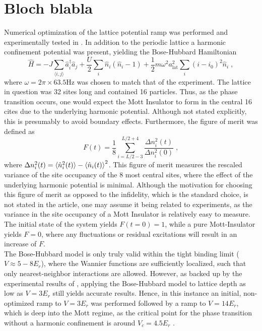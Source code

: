 \section{Bloch blabla}
Numerical optimization of the lattice potential ramp was performed and experimentally tested in \cite{FrankBloch}. In addition to the periodic lattice a harmonic confinement potential was present, yielding the Bose-Hubbard Hamiltonian
\begin{equation}
\hat{H} = - J \sum_{\langle i,j \rangle} \hat{a}_{i}^{\dag} \hat{a}_{j} + \frac{U}{2} \sum_{i} \hat{n}_i \left( \hat{n}_i -1 \right) + \frac{1}{2} m \omega^2 a_{\mathrm{lat}}^2 \sum_{i} \left( i - i_0 \right) ^2 \hat{n}_i \; ,  \label{eq:BHtrap}
\end{equation}
where $\omega = 2 \pi \times 63.5 \mathrm{Hz}$ was chosen to match that of the experiment. The lattice in question was 32 sites long and contained 16 particles. Thus, as the phase transition occurs, one would expect the Mott Insulator to form in the central 16 cites due to the underlying harmonic potential. Although not stated explicitly, this is presumably to avoid boundary effects. Furthermore, the figure of merit was defined as
\begin{equation}
	F(t) = \frac{1}{8} \sum_{i = L/2 -3}^{L/2 +4} \frac{\Delta n_{i}^2 (t)}{\Delta n_{i}^2 (0)} \; , \label{eq:FMerit}
\end{equation}
where $\Delta n_{i}^2 (t) = \braket{\hat{n}_{i}^2 (t)} - \braket{\hat{n}_{i} (t)}^2$. This figure of merit measures the rescaled variance of the site occupancy of the 8 most central sites, where the effect of the underlying harmonic potential is minimal. Although the motivation for choosing this figure of merit as opposed to the infidelity, which is the standard choice, is not stated in the article, one may assume it being related to experiments, as the variance in the site occupancy of a Mott Insulator is relatively easy to measure. The initial state of the system yields $F(t=0) = 1$, while a pure Mott-Insulator yields $F = 0$, where any fluctuations or residual excitations will result in an increase of $F$.\\
The Bose-Hubbard model is only truly valid within the tight binding limit ($V \approx 5-8 E_r$), where the Wannier functions are sufficiently localized, such that only nearest-neighbor interactions are allowed. However, as backed up by the experimental results of \cite{FrankBloch}, applying the Bose-Hubbard model to lattice depth as low as $V = 3 E_r$ still yields accurate results. Hence, in this instance an initial, non-optimized ramp to $V = 3 E_r$ was performed followed by a ramp to $V = 14 E_r$, which is deep into the Mott regime, as the critical point for the phase transition without a harmonic confinement is around $V_c = 4.5 E_r$ \cite{Kuhner2000}.
